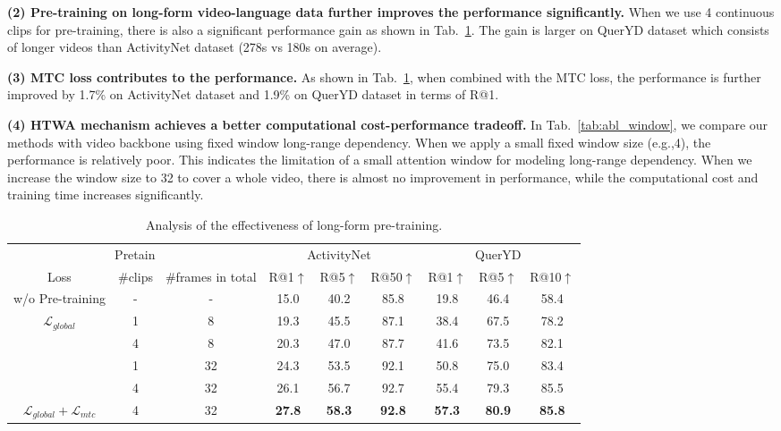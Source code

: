 \documentclass{article}
\begin{document}
\textbf{(2) Pre-training on long-form video-language data further improves the performance significantly.}
When we use 4 continuous clips for pre-training, there is also a significant performance gain as shown in Tab.~\ref{tab:abl_longform}. The gain is larger on QuerYD dataset which consists of longer videos than ActivityNet dataset (278s vs 180s on average).

\textbf{(3) MTC loss contributes to the performance.}
As shown in Tab.~\ref{tab:abl_longform}, when combined with the MTC loss, the performance is further improved by 1.7\% on ActivityNet dataset and 1.9\% on QuerYD dataset in terms of R@1. 

\textbf{(4) HTWA mechanism achieves a better computational cost-performance tradeoff.}
In Tab.~\ref{tab:abl_window}, we compare our methods with video backbone using fixed window long-range dependency. When we apply a small fixed window size (e.g.,4), the performance is relatively poor. This indicates the limitation of a small attention window for modeling long-range dependency. When we increase the window size to 32 to cover a whole video, there is almost no improvement in performance, while the computational cost and training time increases significantly. 

\begin{table}[t]
    \small
    \centering
    \caption{Analysis of the effectiveness of long-form pre-training.}
    \begin{tabular}{c c c c c c c c c} 
    \toprule
    \multicolumn{3}{c}{Pretain}&\multicolumn{3}{c}{ActivityNet~\cite{krishna2017actnetcaption}}&\multicolumn{3}{c}{QuerYD~\cite{oncescu2021queryd}} \\ 
    \cmidrule{1-9}
    Loss & \#clips & \#frames in total & R@1$\uparrow$ & R@5$\uparrow$ & R@50$\uparrow$ &  R@1$\uparrow$ & R@5$\uparrow$ & R@10$\uparrow$ \\
    \cmidrule{1-9}
    w/o Pre-training &- &- &15.0 &40.2 & 85.8 &19.8 &46.4 &58.4\\
    \cmidrule{1-9}
    \multirow{4}{*}{$\mathcal{L}_{global}$} 
    & 1 &8 &19.3 &45.5 &87.1 &38.4 &67.5 &78.2 \\ 
    & 4 &8 &20.3 &47.0 &87.7 &41.6 &73.5 &82.1 \\
    & 1 &32 &24.3 &53.5 &92.1 &50.8 &75.0 &83.4\\
    & 4 &32 & 26.1 & 56.7 & 92.7 &55.4 &79.3 &85.5\\
    \cmidrule{1-9}
    $\mathcal{L}_{global} + \mathcal{L}_{mtc}$ & 4 &32 & \bf 27.8 & \bf 58.3 & \bf 92.8 &\bf57.3 &\bf80.9 &\bf85.8 \\
    \cmidrule{1-9}
    \end{tabular}
    \label{tab:abl_longform}
\end{table}
\end{document}
